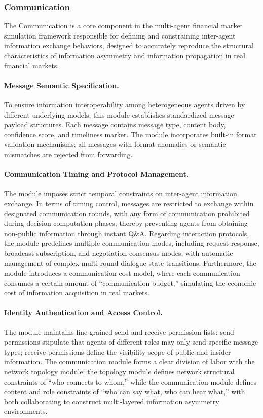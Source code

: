 \documentclass{article}
\begin{document}
\subsubsection{Communication}
\label{subsubsec:communication}

The Communication is a core component in the multi-agent financial market simulation framework responsible for defining and constraining inter-agent information exchange behaviors, designed to accurately reproduce the structural characteristics of information asymmetry and information propagation in real financial markets.

\paragraph{Message Semantic Specification.}
To ensure information interoperability among heterogeneous agents driven by different underlying models, this module establishes standardized message payload structures. Each message contains message type, content body, confidence score, and timeliness marker. The module incorporates built-in format validation mechanisms; all messages with format anomalies or semantic mismatches are rejected from forwarding.

\paragraph{Communication Timing and Protocol Management.}
The module imposes strict temporal constraints on inter-agent information exchange. In terms of timing control, messages are restricted to exchange within designated communication rounds, with any form of communication prohibited during decision computation phases, thereby preventing agents from obtaining non-public information through instant Q\&A. Regarding interaction protocols, the module predefines multiple communication modes, including request-response, broadcast-subscription, and negotiation-consensus modes, with automatic management of complex multi-round dialogue state transitions. Furthermore, the module introduces a communication cost model, where each communication consumes a certain amount of ``communication budget,'' simulating the economic cost of information acquisition in real markets.

\paragraph{Identity Authentication and Access Control.}
The module maintains fine-grained send and receive permission lists: send permissions stipulate that agents of different roles may only send specific message types; receive permissions define the visibility scope of public and insider information. The communication module forms a clear division of labor with the network topology module: the topology module defines network structural constraints of ``who connects to whom,'' while the communication module defines content and role constraints of ``who can say what, who can hear what,'' with both collaborating to construct multi-layered information asymmetry environments.
\end{document}
